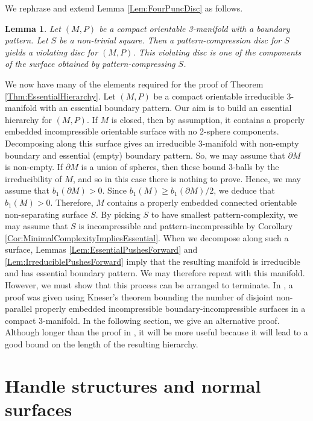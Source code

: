 \documentclass[oneside]{amsart}
\numberwithin{equation}{section}
\theoremstyle{plain}
\newtheorem{lemma}[equation]{Lemma}
\theoremstyle{definition}
\begin{document}
We rephrase and extend Lemma \ref{Lem:FourPuncDisc} as follows.

\begin{lemma}
\label{Lem:PatternComp4Disc}
Let $(M,P)$ be a compact orientable 3-manifold with a boundary pattern. Let $S$ be a non-trivial square. Then a pattern-compression disc for $S$ yields a violating disc for $(M,P)$. This violating disc is one of the components of the surface obtained by pattern-compressing $S$.
\end{lemma}

We now have many of the elements required for the proof of Theorem \ref{Thm:EssentialHierarchy}. 
Let $(M,P)$ be a compact orientable irreducible 3-manifold with an essential boundary pattern. 
Our aim is to build an essential hierarchy for $(M,P)$.
If $M$ is closed, then by assumption, it contains a properly embedded incompressible 
orientable surface with no 2-sphere components. Decomposing along this surface gives an irreducible 3-manifold with non-empty boundary and essential (empty) boundary pattern. So, we may assume that $\partial M$ is non-empty.
If $\partial M$ is a union of spheres, then these bound 3-balls by the irreducibility of $M$, and so in this case there is nothing to prove. Hence, we may assume that $b_1(\partial M) > 0$. Since $b_1(M) \geq b_1(\partial M)/2$, we deduce that $b_1(M)>0$. Therefore, $M$ contains a properly embedded connected orientable non-separating surface $S$. By picking $S$ to have smallest pattern-complexity, we may assume that $S$ is incompressible and pattern-incompressible by Corollary \ref{Cor:MinimalComplexityImpliesEssential}. When we decompose along such a surface, Lemmas \ref{Lem:EssentialPushesForward} and \ref{Lem:IrreduciblePushesForward} imply that the resulting manifold is irreducible and has essential boundary pattern. We may therefore repeat with this manifold. However, we must show that this process can be arranged to terminate. In \cite{Lackenby:Notes}, a proof was given using Kneser's theorem bounding the number of disjoint non-parallel properly embedded incompressible boundary-incompressible surfaces in a compact 3-manifold. In the following section, we give an alternative proof. Although longer than the proof in \cite{Lackenby:Notes}, it will be more useful because it will lead to a good bound on the length of the resulting hierarchy.



\section{Handle structures and normal surfaces} 
\label{Sec:HandleNormal}
\end{document}
